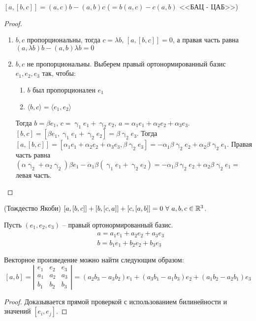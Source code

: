 \begin{Suggestion}
  $[a, [b, c]] = (a, c)b - (a, b)c$ ($= b(a, c) - c(a, b)$ <<БАЦ - ЦАБ>>)
  \begin{proof}\leavevmode
    \begin{enumerate}
      \item $b, c$ пропорциональны, тогда $c = \lambda b$, $[a, [b, c]] = 0$, а правая часть равна $(a, \lambda b)b - (a, b)\lambda b = 0$
      \item $b, c$ не пропорциональны. Выберем правый ортонормированный базис $e_1, e_2, e_3$ так, чтобы:
        \begin{enumerate}
          \item $b$ был пропорционален $e_1$
          \item $\langle b, c \rangle  = \langle e_1, e_2 \rangle$
        \end{enumerate}
        Тогда $b = \beta e_1$, $c = \upgamma_1 e_1 + \upgamma_2 e_2$, $a = \alpha_1 e_1 + \alpha_2 e_2 + \alpha_3 e_3$. $[b, c] = [\beta e_1, \upgamma_1 e_1 + \upgamma_2 e_2] = \beta \upgamma_2 e_3$. Тогда $[a, [b, c]] = [\alpha_1 e_1 + \alpha_2 e_2 + \alpha_3 e_3, \beta \upgamma_2 e_3] = -\alpha_1 \beta \upgamma_2 e_2 + \alpha_2 \beta \upgamma_2 e_1$. Правая часть равна $(\alpha \upgamma_2 + \alpha_2 \upgamma_2)\beta e_1 - \alpha_1 \beta(\upgamma_1 e_1 + \upgamma_2 e_2) = -\alpha_1 \beta \upgamma_2 e_2 + \alpha_2 \beta \upgamma_2 e_1 = $ левая часть.
    \end{enumerate}
  \end{proof}
\end{Suggestion}

\begin{Consequence} (Тождество Якоби)
  $[a, [b, c]] + [b, [c, a]] + [c, [a, b]] = 0\ \forall\ a, b, c \in \mathbb{R}^3$.
\end{Consequence}

Пусть $(e_1, e_2, e_3)$ -- правый ортонормированный базис.
\begin{align}
  &a = a_1e_1 + a_2e_2 + a_3e_3 \\
  &b = b_1e_1 + b_2e_2 + b_3e_3
\end{align}

\begin{Suggestion}
Векторное произведение можно найти следующим образом:
\[
  [a,b] =
  \left|
  \begin{array}{ccc}
    e_1 & e_2 & e_3 \\
    a_1 & a_2 & a_3 \\
    b_1 & b_2 & b_3
  \end{array}
  \right|
  = (a_2b_3 - a_3b_2)e_1 + (a_3b_1 - a_1b_3)e_2 + (a_1b_2 - a_2b_1)e_3
\]
\begin{proof}
  Доказывается прямой проверкой с использованием билинейности и значений $[e_i, e_j]$.
\end{proof}
\end{Suggestion}
